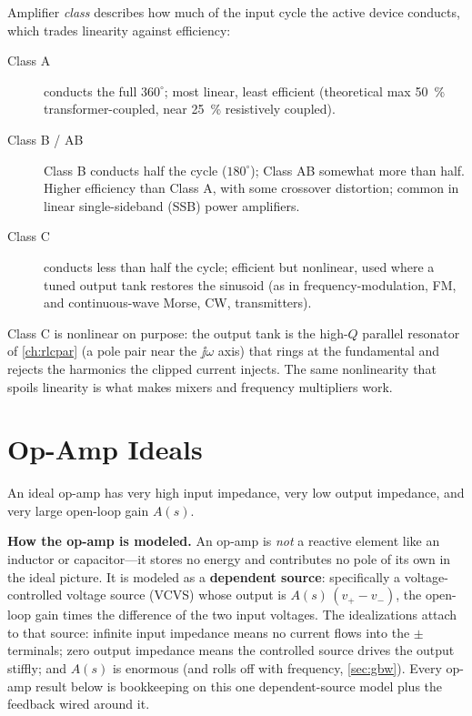 Amplifier \emph{class} describes how much of the input cycle the active device
conducts, which trades linearity against efficiency:
\begin{description}
\item[Class A] conducts the full \(360^\circ\); most linear, least efficient
(theoretical max \SI{50}{\percent} transformer-coupled, near \SI{25}{\percent}
resistively coupled).
\item[Class B / AB] Class B conducts half the cycle (\(180^\circ\)); Class AB
somewhat more than half. Higher efficiency than Class A, with some crossover
distortion; common in linear single-sideband (SSB) power amplifiers.
\item[Class C] conducts less than half the cycle; efficient but nonlinear, used
where a tuned output tank restores the sinusoid (as in frequency-modulation, FM,
and continuous-wave Morse, CW, transmitters).
\end{description}
Class C is nonlinear on purpose: the output tank is the high-\(Q\) parallel resonator
of \cref{ch:rlcpar} (a pole pair near the \(\jj\omega\) axis) that rings at the
fundamental and rejects the harmonics the clipped current injects. The same nonlinearity that spoils
linearity is what makes mixers and frequency multipliers work.

\section{Op-Amp Ideals}
An ideal op-amp has very high input impedance, very low output impedance, and
very large open-loop gain \(A(s)\).

\begin{physicalbox}
\textbf{How the op-amp is modeled.} An op-amp is \emph{not} a reactive element
like an inductor or capacitor---it stores no energy and contributes no pole of its
own in the ideal picture. It is modeled as a \textbf{dependent source}:
specifically a voltage-controlled voltage source (VCVS) whose output is
\(A(s)\,(v_+-v_-)\), the open-loop gain times the difference of the two input
voltages. The idealizations attach to that source: infinite input impedance means
no current flows into the \(\pm\) terminals; zero output impedance means the
controlled source drives the output stiffly; and \(A(s)\) is enormous (and rolls
off with frequency, \cref{sec:gbw}). Every op-amp result below is bookkeeping on
this one dependent-source model plus the feedback wired around it.
\end{physicalbox}

